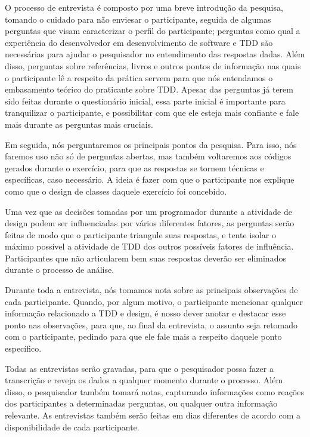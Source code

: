 O processo de entrevista é composto por uma breve introdução da pesquisa, tomando
o cuidado para não enviesar o participante, seguida de algumas perguntas que visam
caracterizar o perfil do participante; perguntas como qual a experiência do
desenvolvedor em desenvolvimento de software e TDD são necessárias para ajudar o
pesquisador no entendimento das respostas dadas. Além disso, perguntas sobre
referências, livros e outros pontos de informação nas quais o participante lê a
respeito da prática servem para que nós entendamos o embasamento teórico
do praticante sobre TDD. Apesar das perguntas já terem sido feitas durante
o questionário inicial, essa parte inicial é importante para tranquilizar
o participante, e possibilitar com que ele esteja mais confiante e fale
mais durante as perguntas mais cruciais.

Em seguida, nós perguntaremos os principais pontos da pesquisa.
Para isso, nós faremos uso não só de perguntas abertas, mas também
voltaremos aos códigos gerados durante o exercício, para que as respostas se tornem técnicas e
específicas, caso necessário. A ideia é fazer com que o participante nos explique
como que o design de classes daquele exercício foi concebido.

Uma vez que as decisões tomadas por um programador durante a atividade de design
podem ser influenciadas por vários diferentes fatores, 
as perguntas serão feitas de modo que o participante triangule suas respostas,
e tente isolar o máximo possível a atividade de TDD dos outros possíveis fatores
de influência. Participantes que não articularem bem suas respostas deverão ser eliminados
durante o processo de análise.

Durante toda a entrevista, nós tomamos nota sobre as principais observações
de cada participante. Quando, por algum motivo, o participante mencionar qualquer
informação relacionado a TDD e design, é nosso dever anotar e destacar esse ponto
nas observações, para que, ao final da entrevista, o assunto seja retomado com 
o participante, pedindo para que ele fale mais a respeito daquele ponto específico.

Todas as entrevistas serão gravadas, para que o pesquisador possa fazer a
transcrição e reveja os dados a qualquer momento durante o processo. Além disso,
o pesquisador também tomará notas, capturando informações como reações dos 
participantes a determinadas perguntas, ou qualquer outra informação relevante. 
As entrevistas também serão feitas em dias diferentes de acordo com a disponibilidade
de cada participante.

